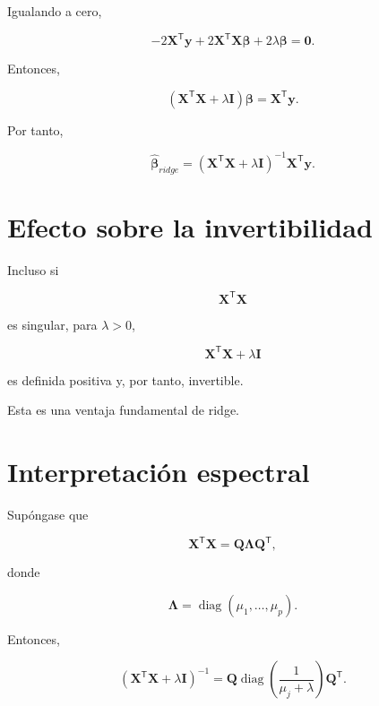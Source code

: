 \documentclass[
  spanish,
  10.5pt,
  letterpaper,
  DIV=11,
  numbers=noendperiod,
  oneside,
  open=any]{scrreprt}
\theoremstyle{definition}
\theoremstyle{definition}
\theoremstyle{plain}
\theoremstyle{remark}
\begin{document}
Igualando a cero,

\[
-2\mathbf{X}^{\mathsf T}\mathbf{y}
+
2\mathbf{X}^{\mathsf T}\mathbf{X}\boldsymbol{\beta}
+
2\lambda\boldsymbol{\beta}
=
\mathbf{0}.
\]

Entonces,

\[
\left(
\mathbf{X}^{\mathsf T}\mathbf{X}
+
\lambda\mathbf{I}
\right)
\boldsymbol{\beta}
=
\mathbf{X}^{\mathsf T}\mathbf{y}.
\]

Por tanto,

\[
\widehat{\boldsymbol{\beta}}_{ridge}
=
\left(
\mathbf{X}^{\mathsf T}\mathbf{X}
+
\lambda\mathbf{I}
\right)^{-1}
\mathbf{X}^{\mathsf T}\mathbf{y}.
\]

\section*{Efecto sobre la
invertibilidad}\label{efecto-sobre-la-invertibilidad}


Incluso si

\[
\mathbf{X}^{\mathsf T}\mathbf{X}
\]

es singular, para \(\lambda>0\),

\[
\mathbf{X}^{\mathsf T}\mathbf{X}
+
\lambda\mathbf{I}
\]

es definida positiva y, por tanto, invertible.

Esta es una ventaja fundamental de ridge.

\section*{Interpretación espectral}\label{interpretaciuxf3n-espectral}


Supóngase que

\[
\mathbf{X}^{\mathsf T}\mathbf{X}
=
\mathbf{Q}
\boldsymbol{\Lambda}
\mathbf{Q}^{\mathsf T},
\]

donde

\[
\boldsymbol{\Lambda}
=
\operatorname{diag}
(\mu_1,\ldots,\mu_p).
\]

Entonces,

\[
\left(
\mathbf{X}^{\mathsf T}\mathbf{X}
+
\lambda\mathbf{I}
\right)^{-1}
=
\mathbf{Q}
\operatorname{diag}
\left(
\frac{1}{\mu_j+\lambda}
\right)
\mathbf{Q}^{\mathsf T}.
\]
\end{document}
